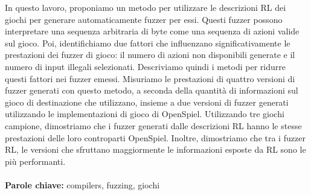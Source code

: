 \documentclass{Configuration_Files/PoliMi3i_thesis}
\begin{document}
In questo lavoro, proponiamo un metodo per utilizzare le descrizioni RL dei giochi per generare automaticamente fuzzer per essi.
Questi fuzzer possono interpretare una sequenza arbitraria di byte come una sequenza di azioni valide sul gioco.
Poi, identifichiamo due fattori che influenzano significativamente le prestazioni dei fuzzer di gioco: il numero di azioni non disponibili generate e il numero di input illegali selezionati.
Descriviamo quindi i metodi per ridurre questi fattori nei fuzzer emessi.
Misuriamo le prestazioni di quattro versioni di fuzzer generati con questo metodo, a seconda della quantità di informazioni sul gioco di destinazione che utilizzano, insieme a due versioni di fuzzer generati utilizzando le implementazioni di gioco di OpenSpiel.
Utilizzando tre giochi campione, dimostriamo che i fuzzer generati dalle descrizioni RL hanno le stesse prestazioni delle loro controparti OpenSpiel.
Inoltre, dimostriamo che tra i fuzzer RL, le versioni che sfruttano maggiormente le informazioni esposte da RL sono le più performanti.
\\
\\
\textbf{Parole chiave:} compilers, fuzzing, giochi

\thispagestyle{empty}
\tableofcontents %
\thispagestyle{empty}
\cleardoublepage

%
%
%    
%

\mainmatter %
\end{document}
